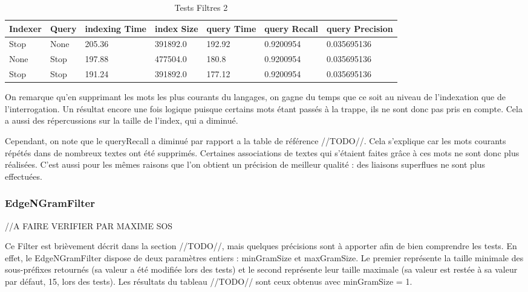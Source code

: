 \begin{table}[H]
                \centering
                \begin{tabular}{|p{2cm}|p{2cm}|p{2cm}|p{2cm}|p{2cm}|p{2cm}|p{2cm}|}
                    \hline
                    \textbf{Indexer} & \textbf{Query} & \textbf{indexing Time} & \textbf{index Size} & \textbf{query Time} & \textbf{query Recall} & \textbf{query Precision}\\
                    \hline
Stop & None & 205.36 & 391892.0 & 192.92 & 0.9200954 & 0.035695136\\
		\hline
None & Stop & 197.88 & 477504.0 & 180.8 & 0.9200954 & 0.035695136\\
		\hline
Stop & Stop & 191.24 & 391892.0 & 177.12 & 0.9200954 & 0.035695136\\
                    \hline
                \end{tabular}
                \caption{Tests Filtres 2}
                \label{tab:tests_filtres_2}
            \end{table}

On remarque qu’en supprimant les mots les plus courants du langages, on gagne du temps que ce soit au niveau de l’indexation que de l’interrogation. Un résultat encore une fois logique puisque certains mots étant passés à la trappe, ils ne sont donc pas pris en compte. Cela a aussi des répercussions sur la taille de l’index, qui a diminué.
	
Cependant, on note que le queryRecall a diminué par rapport a la table de référence //TODO//. Cela s’explique car les mots courants répétés dans de nombreux textes ont été supprimés. Certaines associations de textes qui s’étaient faites grâce à ces mots ne sont donc plus réalisées. C’est aussi pour les mêmes raisons que l’on obtient un précision de meilleur qualité : des liaisons superflues ne sont plus effectuées.

\subsubsection{EdgeNGramFilter}
//A FAIRE VERIFIER PAR MAXIME SOS

Ce Filter est brièvement décrit dans la section //TODO//, mais quelques précisions sont à apporter afin de bien comprendre les tests. En effet, le EdgeNGramFilter dispose de deux paramètres entiers : minGramSize et maxGramSize. Le premier représente la taille minimale des sous-préfixes retournés (sa valeur a été modifiée lors des tests) et le second représente leur taille maximale (sa valeur est restée à sa valeur par défaut, 15, lors des tests). Les résultats du tableau //TODO// sont ceux obtenus avec minGramSize = 1.

